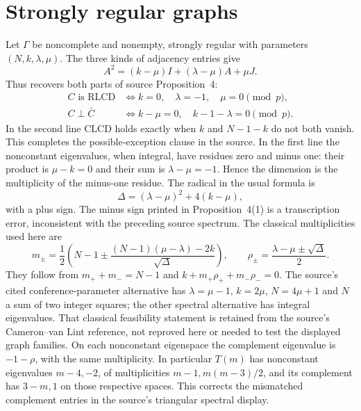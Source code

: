 \section{Strongly regular graphs}
Let $\Gamma$ be noncomplete and nonempty, strongly regular with parameters
$(N,k,\lambda,\mu)$. The three kinds of adjacency entries give
\[
 A^2=(k-\mu)I+(\lambda-\mu)A+\mu J.
\]
Thus  recovers both parts of source Proposition~4:
\[
\begin{split}
 C\text{ is RLCD}&\iff k=0,\quad\lambda=-1,\quad\mu=0\pmod p,\\
 C\perp\bar C&\iff k-\mu=0,\quad k-1-\lambda=0\pmod p.
\end{split}
\]
In the second line CLCD holds exactly when $k$ and $N-1-k$ do not both
vanish. This completes the possible-exception clause in the source.
In the first line the nonconstant eigenvalues, when integral, have
residues zero and minus one: their product is $\mu-k=0$ and their sum
is $\lambda-\mu=-1$. Hence the dimension is the multiplicity of the
minus-one residue. The radical in the usual formula is
\[
 \Delta=(\lambda-\mu)^2+4(k-\mu),
\]
with a plus sign. The minus sign printed in Proposition~4(1) is a
transcription error, inconsistent with the preceding source spectrum.
The classical multiplicities used here are
\[
 m_\pm=\frac12\left(N-1\pm
 \frac{(N-1)(\mu-\lambda)-2k}{\sqrt\Delta}\right),
 \qquad \rho_\pm=\frac{\lambda-\mu\pm\sqrt\Delta}{2}.
\]
They follow from $m_++m_-=N-1$ and $k+m_+\rho_++m_-\rho_-=0$.
The source's cited conference-parameter alternative has
$\lambda=\mu-1$, $k=2\mu$, $N=4\mu+1$ and $N$ a sum of two
integer squares; the other spectral alternative has integral eigenvalues.
That classical feasibility statement is retained from the source's
Cameron--van Lint reference, not reproved here or needed to test the
displayed graph families. On each nonconstant eigenspace the complement
eigenvalue is $-1-\rho$, with the same multiplicity.
In particular $T(m)$ has nonconstant eigenvalues $m-4,-2$, of
multiplicities $m-1,m(m-3)/2$, and its complement has $3-m,1$ on
those respective spaces. This corrects the mismatched complement
entries in the source's triangular spectral display.

